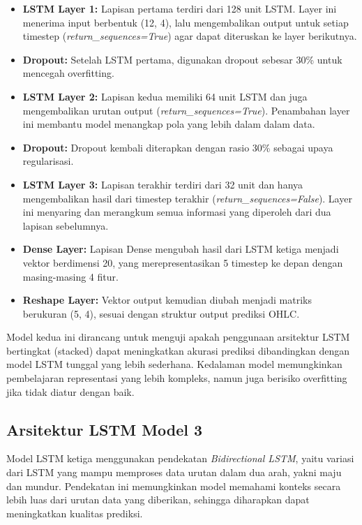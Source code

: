 \begin{itemize}
    \item \textbf{LSTM Layer 1:} Lapisan pertama terdiri dari 128 unit LSTM. Layer ini menerima input berbentuk (12, 4), lalu mengembalikan output untuk setiap timestep (\textit{return\_sequences=True}) agar dapat diteruskan ke layer berikutnya.
    
    \item \textbf{Dropout:} Setelah LSTM pertama, digunakan dropout sebesar 30\% untuk mencegah overfitting.
    
    \item \textbf{LSTM Layer 2:} Lapisan kedua memiliki 64 unit LSTM dan juga mengembalikan urutan output (\textit{return\_sequences=True}). Penambahan layer ini membantu model menangkap pola yang lebih dalam dalam data.
    
    \item \textbf{Dropout:} Dropout kembali diterapkan dengan rasio 30\% sebagai upaya regularisasi.
    
    \item \textbf{LSTM Layer 3:} Lapisan terakhir terdiri dari 32 unit dan hanya mengembalikan hasil dari timestep terakhir (\textit{return\_sequences=False}). Layer ini menyaring dan merangkum semua informasi yang diperoleh dari dua lapisan sebelumnya.
    
    \item \textbf{Dense Layer:} Lapisan Dense mengubah hasil dari LSTM ketiga menjadi vektor berdimensi 20, yang merepresentasikan 5 timestep ke depan dengan masing-masing 4 fitur.
    
    \item \textbf{Reshape Layer:} Vektor output kemudian diubah menjadi matriks berukuran (5, 4), sesuai dengan struktur output prediksi OHLC.
\end{itemize}

Model kedua ini dirancang untuk menguji apakah penggunaan arsitektur LSTM bertingkat (stacked) dapat meningkatkan akurasi prediksi dibandingkan dengan model LSTM tunggal yang lebih sederhana. Kedalaman model memungkinkan pembelajaran representasi yang lebih kompleks, namun juga berisiko overfitting jika tidak diatur dengan baik.

\subsection{Arsitektur LSTM Model 3}
Model LSTM ketiga menggunakan pendekatan \textit{Bidirectional LSTM}, yaitu variasi dari LSTM yang mampu memproses data urutan dalam dua arah, yakni maju dan mundur. Pendekatan ini memungkinkan model memahami konteks secara lebih luas dari urutan data yang diberikan, sehingga diharapkan dapat meningkatkan kualitas prediksi.

